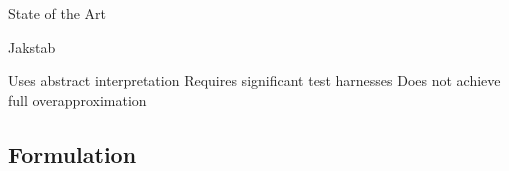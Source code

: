 \begin{frame}{State of the Art}
  \begin{block}{Jakstab}
    \begin{outline}
      \1 Uses \alert{abstract interpretation}
      \1 Requires significant \alert{test harnesses}
      \1 Does not achieve full \alert{overapproximation}
    \end{outline}
  \end{block}
\end{frame}

\subsection{Formulation}

%
%
%
%
